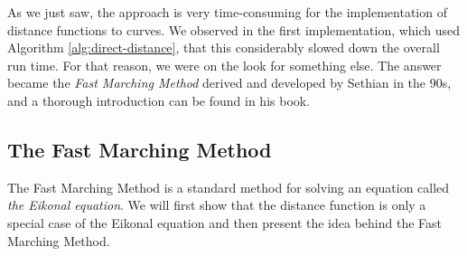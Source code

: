 As we just saw, the approach is very time-consuming for the implementation of distance functions to curves. We observed in the first implementation, which used Algorithm \ref{alg:direct-distance}, that this considerably slowed down the overall run time. For that reason, we were on the look for something else. The answer became the \textit{Fast Marching Method} derived and developed by Sethian in the $90$s, and a thorough introduction can be found in his book\cite{sethian1999level}.

\begin{comment}
The unsigned distance function is only used in the initialization to calculate \distanceV\ defined in \eqref{eq:unsigned-distance-function}, namely the distance to the point set, which is constant throughout the algorithm. The signed distance function, \signeddistance, on the other hand, is both used in the initialization to construct the initial higher dimensional curve and in the re-initialization procedure.

From \secref{sec:distance-function} we saw that finding the unsigned distance function to an object is really solving the minimization problem \eqref{eq:unsigned-distance-function}. We also saw that the signed distance function, \signeddistance, is only an unsigned distance, $d(\mathbf{x}, \curvem)$, where it is multiplied with a negative sign on the inside of the curve. In addition, in a discretized setting, the zero level set curve is also a set of points where $\uxtm=0$ and thus similar to $d(\mathbf{x}, \pointsetm)$.

For this reason, both the signed distance to the curve and the unsigned distance to the point set reduces to the same problem: solving \eqref{eq:unsigned-distance-function} for a set of points. Solving this equation is thus where we begin.

The most obvious way to solve the minimization problem \eqref{eq:unsigned-distance-function} is to approach it straight forwards as it is stated: for all grid points, go through all the sample points, find the closest one and return the distance. 
\end{comment}






\subsection{The Fast Marching Method}
The Fast Marching Method is a standard method for solving an equation called \textit{the Eikonal equation}. We will first show that the distance function is only a special case of the Eikonal equation and then present the idea behind the Fast Marching Method. 

